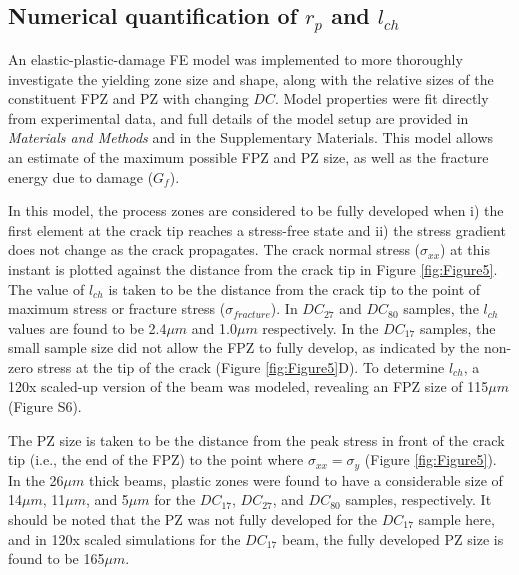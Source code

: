 \documentclass[11pt]{article}
\providecommand{\um}[0]{$\mu m$}
\providecommand{\rp}[0]{$r_p$}
\providecommand{\lch}[0]{$l_{ch}$}
\providecommand{\SI}[0]{Supplementary Materials}
\providecommand{\DC}[0]{$DC$}
\providecommand{\DCi}[0]{$DC_{17}$}
\providecommand{\DCj}[0]{$DC_{27}$}
\providecommand{\DCk}[0]{$DC_{80}$}
\providecommand{\Gf}[0]{$G_{f}$}
\begin{document}
        \subsection{Numerical quantification of $r_p$ and $l_{ch}$}
        An elastic-plastic-damage FE model \cite{salviato2022adding} was implemented to more thoroughly investigate the yielding zone size and shape, along with the relative sizes of the constituent FPZ and PZ with changing \DC{}.
        Model properties were fit directly from experimental data, and full details of the model setup are provided in \textit{Materials and Methods} and in the \SI{}.
        This model allows an estimate of the maximum possible FPZ and PZ size, as well as the fracture energy due to damage (\Gf{}). 
        
        In this model, the process zones are considered to be fully developed when i) the first element at the crack tip reaches a stress-free state and ii) the stress gradient does not change as the crack propagates.
        The crack normal stress ($\sigma_{xx}$) at this instant is plotted against the distance from the crack tip in Figure \ref{fig:Figure5}.
        The value of \lch{} is taken to be the distance from the crack tip to the point of maximum stress or fracture stress ($\sigma_{fracture}$).
        In \DCj{} and \DCk{} samples, the \lch{} values are found to be 2.4\um{} and 1.0\um{} respectively.
        In the \DCi{} samples, the small sample size did not allow the FPZ to fully develop, as indicated by the non-zero stress at the tip of the crack (Figure \ref{fig:Figure5}D).
        To determine \lch{}, a 120x scaled-up version of the beam was modeled, revealing an FPZ size of 115\um{} (Figure S6).

        The PZ size is taken to be the distance from the peak stress in front of the crack tip (i.e., the end of the FPZ) to the point where $\sigma_{xx}=\sigma_y$ (Figure \ref{fig:Figure5}).
        In the 26\um{} thick beams, plastic zones were found to have a considerable size of 14\um{}, 11\um{}, and 5\um{} for the \DCi{}, \DCj{}, and \DCk{} samples, respectively.
        It should be noted that the PZ was not fully developed for the \DCi{} sample here, and in 120x scaled simulations for the \DCi{} beam, the fully developed PZ size is found to be 165\um{}. 
        
\end{document}
